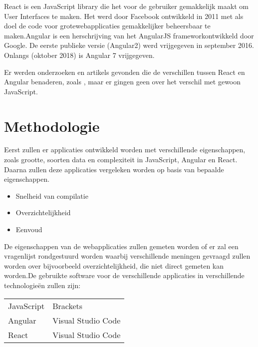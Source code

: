 React is een JavaScript library die het voor de gebruiker gemakkelijk maakt om User Interfaces te maken. Het werd door Facebook ontwikkeld in 2011 met als doel de code voor grotewebapplicaties gemakkelijker beheersbaar te maken.Angular is een herschrijving van het AngularJS frameworkontwikkeld door Google. De eerste publieke versie (Angular2) werd vrijgegeven in september 2016. Onlangs (oktober 2018) is Angular 7 vrijgegeven. 

Er werden onderzoeken en artikels gevonden die de verschillen tussen React en Angular benaderen, zoals \autocite{FreeCodeCamp2018}, maar er gingen geen over het verschil met gewoon JavaScript. 





\section{Methodologie}
\label{sec:methodologie}

Eerst zullen er applicaties ontwikkeld worden met verschillende eigenschappen, zoals grootte, soorten data en complexiteit in JavaScript, Angular en React. Daarna zullen deze applicaties vergeleken worden op basis van bepaalde eigenschappen. 
\begin{itemize}
	\item Snelheid van compilatie
	\item Overzichtelijkheid
	\item Eenvoud
\end{itemize}

De eigenschappen van de webapplicaties zullen gemeten worden of er zal een vragenlijst rondgestuurd worden waarbij verschillende meningen gevraagd zullen worden over bijvoorbeeld overzichtelijkheid, die niet direct gemeten kan worden.De gebruikte software voor de verschillende applicaties in verschillende technologieën zullen zijn:
\begin{table}[h]
	\begin{tabular}{ll}
		JavaScript & Brackets \\
		Angular & Visual Studio Code \\
		React & Visual Studio Code \\
	\end{tabular}
\end{table}

